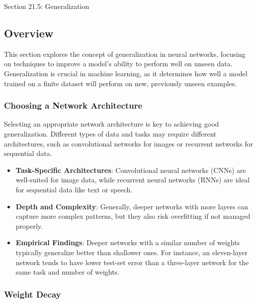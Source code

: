 \begin{notes}{Section 21.5: Generalization}
    \subsection*{Overview}

    This section explores the concept of generalization in neural networks, focusing on techniques to improve a model's ability to perform well on unseen data. Generalization is crucial in machine learning, 
    as it determines how well a model trained on a finite dataset will perform on new, previously unseen examples.
    
    \subsubsection*{Choosing a Network Architecture}
    
    Selecting an appropriate network architecture is key to achieving good generalization. Different types of data and tasks may require different architectures, such as convolutional networks for images 
    or recurrent networks for sequential data.
    
    \begin{highlight}
    
        \begin{itemize}
            \item \textbf{Task-Specific Architectures}: Convolutional neural networks (CNNs) are well-suited for image data, while recurrent neural networks (RNNs) are ideal for sequential data like text 
            or speech.
            \item \textbf{Depth and Complexity}: Generally, deeper networks with more layers can capture more complex patterns, but they also risk overfitting if not managed properly.
            \item \textbf{Empirical Findings}: Deeper networks with a similar number of weights typically generalize better than shallower ones. For instance, an eleven-layer network tends to have lower test-set 
            error than a three-layer network for the same task and number of weights.
        \end{itemize}
    
    \end{highlight}
    
    \subsubsection*{Weight Decay}
    

\end{notes}
